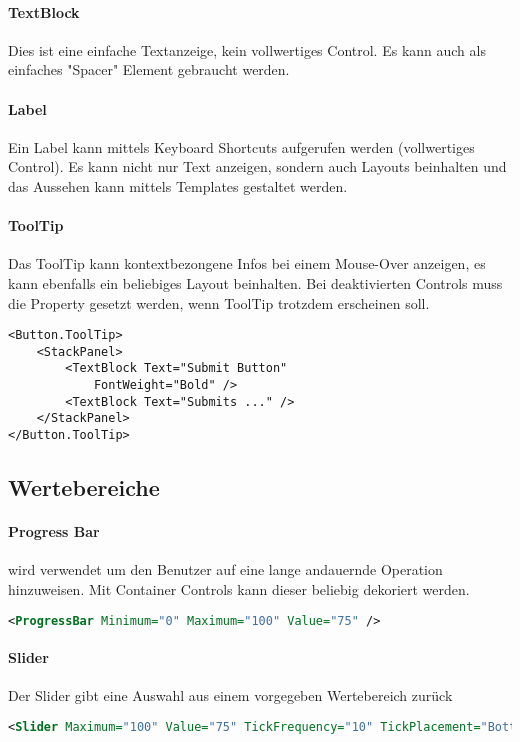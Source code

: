 \paragraph{TextBlock} Dies ist eine einfache Textanzeige, kein vollwertiges Control. Es kann auch als einfaches "{}Spacer"{} Element gebraucht werden.
\paragraph{Label} Ein Label kann mittels Keyboard Shortcuts aufgerufen werden (vollwertiges Control). Es kann nicht nur Text anzeigen, sondern auch Layouts beinhalten und das Aussehen kann mittels Templates gestaltet werden.
\paragraph{ToolTip} Das ToolTip kann kontextbezongene Infos bei einem Mouse-Over anzeigen, es kann ebenfalls ein beliebiges Layout beinhalten. Bei deaktivierten Controls muss die Property  gesetzt werden, wenn ToolTip trotzdem erscheinen soll.
\begin{lstlisting}
<Button.ToolTip>
    <StackPanel>
        <TextBlock Text="Submit Button"
            FontWeight="Bold" />
        <TextBlock Text="Submits ..." />
    </StackPanel>
</Button.ToolTip>
\end{lstlisting}
\subsection{Wertebereiche}
\paragraph{Progress Bar} wird verwendet um den Benutzer auf eine lange andauernde Operation hinzuweisen. Mit Container Controls kann dieser beliebig dekoriert werden. 
\begin{lstlisting}[language=xml]
<ProgressBar Minimum="0" Maximum="100" Value="75" />
\end{lstlisting}
\paragraph{Slider} Der Slider gibt eine Auswahl aus einem vorgegeben Wertebereich zurück
\begin{lstlisting}[language=xml]
<Slider Maximum="100" Value="75" TickFrequency="10" TickPlacement="BottomRight" />
\end{lstlisting}
